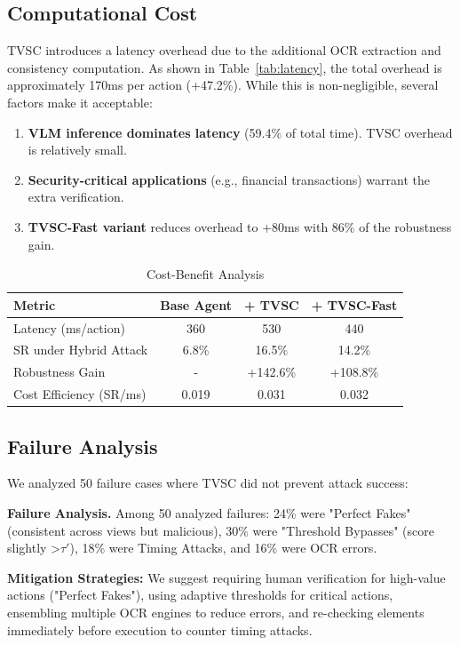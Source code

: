 \documentclass{llncs}
\begin{document}
\subsection{Computational Cost}

TVSC introduces a latency overhead due to the additional OCR extraction and consistency computation. As shown in Table~\ref{tab:latency}, the total overhead is approximately 170ms per action (+47.2\%). While this is non-negligible, several factors make it acceptable:
\begin{enumerate}
    \item \textbf{VLM inference dominates latency} (59.4\% of total time). TVSC overhead is relatively small.
    \item \textbf{Security-critical applications} (e.g., financial transactions) warrant the extra verification.
    \item \textbf{TVSC-Fast variant} reduces overhead to +80ms with 86\% of the robustness gain.
\end{enumerate}

\begin{table}[ht]
\caption{Cost-Benefit Analysis}
\centering
\begin{tabular}{|l|c|c|c|}
\hline
Metric & Base Agent & + TVSC & + TVSC-Fast \\
\hline
Latency (ms/action) & 360 & 530 & 440 \\
SR under Hybrid Attack & 6.8\% & 16.5\% & 14.2\% \\
Robustness Gain & - & +142.6\% & +108.8\% \\
Cost Efficiency (SR/ms) & 0.019 & 0.031 & 0.032 \\
\hline
\end{tabular}
\end{table}

\subsection{Failure Analysis}
We analyzed 50 failure cases where TVSC did not prevent attack success:

\textbf{Failure Analysis.} Among 50 analyzed failures: 24\% were "Perfect Fakes" (consistent across views but malicious), 30\% were "Threshold Bypasses" (score slightly >$\tau'$), 18\% were Timing Attacks, and 16\% were OCR errors.


\textbf{Mitigation Strategies:} We suggest requiring human verification for high-value actions ("Perfect Fakes"), using adaptive thresholds for critical actions, ensembling multiple OCR engines to reduce errors, and re-checking elements immediately before execution to counter timing attacks.
\end{document}
